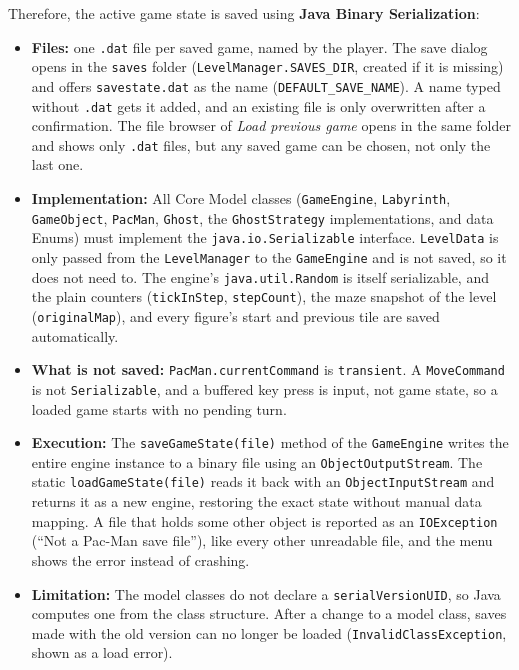 \documentclass[11pt, a4paper]{article}
\begin{document}
Therefore, the active game state is saved using \textbf{Java Binary Serialization}:
\begin{itemize}
    \item \textbf{Files:} one \texttt{.dat} file per saved game, named by the player. The save dialog opens in the \texttt{saves} folder (\texttt{LevelManager.SAVES\_DIR}, created if it is missing) and offers \texttt{savestate.dat} as the name (\texttt{DEFAULT\_SAVE\_NAME}). A name typed without \texttt{.dat} gets it added, and an existing file is only overwritten after a confirmation. The file browser of \textit{Load previous game} opens in the same folder and shows only \texttt{.dat} files, but any saved game can be chosen, not only the last one.
    \item \textbf{Implementation:} All Core Model classes (\texttt{GameEngine}, \texttt{Labyrinth}, \texttt{GameObject}, \texttt{PacMan}, \texttt{Ghost}, the \texttt{GhostStrategy} implementations, and data Enums) must implement the \texttt{java.io.Serializable} interface. \texttt{LevelData} is only passed from the \texttt{LevelManager} to the \texttt{GameEngine} and is not saved, so it does not need to. The engine's \texttt{java.util.Random} is itself serializable, and the plain counters (\texttt{tickInStep}, \texttt{stepCount}), the maze snapshot of the level (\texttt{originalMap}), and every figure's start and previous tile are saved automatically.
    \item \textbf{What is not saved:} \texttt{PacMan.currentCommand} is \texttt{transient}. A \texttt{MoveCommand} is not \texttt{Serializable}, and a buffered key press is input, not game state, so a loaded game starts with no pending turn.
    \item \textbf{Execution:} The \texttt{saveGameState(file)} method of the \texttt{GameEngine} writes the entire engine instance to a binary file using an \texttt{ObjectOutputStream}. The static \texttt{loadGameState(file)} reads it back with an \texttt{ObjectInputStream} and returns it as a new engine, restoring the exact state without manual data mapping. A file that holds some other object is reported as an \texttt{IOException} (``Not a Pac-Man save file''), like every other unreadable file, and the menu shows the error instead of crashing.
    \item \textbf{Limitation:} The model classes do not declare a \texttt{serialVersionUID}, so Java computes one from the class structure. After a change to a model class, saves made with the old version can no longer be loaded (\texttt{InvalidClassException}, shown as a load error).
\end{itemize}
\end{document}

